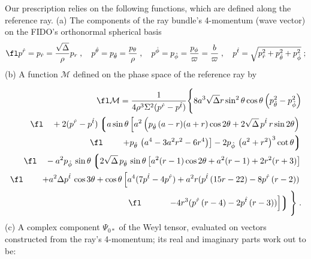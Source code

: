 \documentclass[12pt]{iopart}
\begin{document}
Our prescription relies on the following functions, which are defined
along the reference ray.  (a) The components of the ray bundle's 4-momentum (wave vector) on
the FIDO's orthonormal spherical basis
\begin{equation}
\fl
p^{\hat r} = p_{\hat r} ={\sqrt{\Delta}\over \rho} p_r\;,\quad
p^{\hat \theta} = p_{\hat \theta} = {p_\theta \over\rho} \;,\quad
p^{\hat \phi} = p_{\hat \phi} = {p_\phi \over\varpi} = {b\over\varpi}\;,\quad
p^{\hat t} = \sqrt{p_{\hat r}^2 +p_{\hat \theta}^2 + p_{\hat \phi}^2}\;;
\label{eq:kcomponents}
\end{equation}
(b) A function $\mathcal M$ defined on the phase space of the reference ray by

 \begin{eqnarray}
\fl
\mathcal M =
{1\over {4 \rho ^3 \Sigma ^2
   (p^{\hat r}-p^{\hat t})}}
\Bigg\{8 a^3 \sqrt{\Delta } r \sin ^2\theta \cos \theta
   \left(p_{\hat \theta}^2-p_{\hat \phi}^2\right) \nonumber\\
\fl \quad
  +2
   (p^{\hat r}-p^{\hat t}) \left\lgroup a \sin \theta \left[a^2
   \left(p_{\hat \theta} \,(a-r) (a+r) \cos 2\theta+2
   \sqrt{\Delta } \,p^{\hat t}\, r \sin 2 \theta
   \right)
   \right.\right. \nonumber\\
\fl \quad\quad
 \left.\left.
 +p_{\hat \theta} \,\left(a^4-3 a^2 r^2-6
   r^4\right)\right]
   -2 p_{\hat \phi}\, \left(a^2+r^2\right)^3
   \cot \theta\right\rgroup
   \label{eq:calM}\\
\fl \quad
   -a^2 p_{\hat \phi}\, \sin \theta
   \left\lgroup 2 \sqrt{\Delta } \,p_{\hat \theta}\, \sin \theta
   \left[a^2 (r-1) \cos 2\theta+a^2 (r-1)+2 r^2
   (r+3)\right]
   \right. \nonumber \\
\fl \quad\quad
    \left.
   +a^2 \Delta  p^{\hat t}\, \cos 3\theta+\cos
   \theta \left[a^4 (7 p^{\hat t}-4 p^{\hat r})+a^2 r
   (p^{\hat t} \,(15 r-22)-8 p^{\hat r} \,(r-2))
\right.\right. \nonumber \\
\fl \quad\quad\quad
   \left.\left.
-4 r^3 (p^{\hat r}\,
   (r-4)-2 p^{\hat t}\, (r-3))\right]\right\rgroup
   \Bigg\} \;. \nonumber 
    \end{eqnarray}
(c) A complex component $\Psi_{0*}$ of the Weyl tensor, evaluated on vectors constructed from the ray's 4-momentum;  its real and imaginary parts work out to be:
\end{document}
